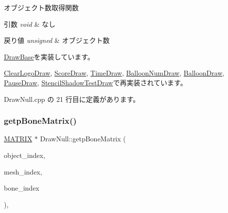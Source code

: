オブジェクト数取得関数 


\begin{DoxyParams}{引数}
{\em void} & なし \\
\hline
\end{DoxyParams}

\begin{DoxyRetVals}{戻り値}
{\em unsigned} & オブジェクト数 \\
\hline
\end{DoxyRetVals}


\mbox{\hyperlink{class_draw_base_a57c010b4386dc09afa124fba81a6e0fc}{Draw\+Base}}を実装しています。



\mbox{\hyperlink{class_clear_logo_draw_ad58068c5cfa0236b559e3a5b526b22d7}{Clear\+Logo\+Draw}}, \mbox{\hyperlink{class_score_draw_a15a6210aebf09d1472c4e4194950456c}{Score\+Draw}}, \mbox{\hyperlink{class_time_draw_aea19327b7f9a50a9e634fbb56d430222}{Time\+Draw}}, \mbox{\hyperlink{class_balloon_num_draw_ac9fbbdb35976d81abb6d4b9ce0c128f3}{Balloon\+Num\+Draw}}, \mbox{\hyperlink{class_balloon_draw_a979518a6cc85aa355f680336953b5e46}{Balloon\+Draw}}, \mbox{\hyperlink{class_pause_draw_a44936b777c942619b85106d7aa4dda14}{Pause\+Draw}}, \mbox{\hyperlink{class_stencil_shadow_test_draw_ad93f1c8a60a701d185108896c58dd578}{Stencil\+Shadow\+Test\+Draw}}で再実装されています。



 Draw\+Null.\+cpp の 21 行目に定義があります。

\mbox{\label{class_draw_null_a9843abd940623bf84bbb0931f7e21af6}} 
\subsubsection{\texorpdfstring{getp\+Bone\+Matrix()}{getpBoneMatrix()}}
{\footnotesize\ttfamily \mbox{\hyperlink{_matrix_8h_a032295cd9fb1b711757c90667278e744}{M\+A\+T\+R\+IX}} $\ast$ Draw\+Null\+::getp\+Bone\+Matrix (\begin{DoxyParamCaption}\item[{unsigned}]{object\+\_\+index,  }\item[{unsigned}]{mesh\+\_\+index,  }\item[{unsigned}]{bone\+\_\+index }\end{DoxyParamCaption})\hspace{0.3cm}{\ttfamily [override]}, {\ttfamily [virtual]}}



